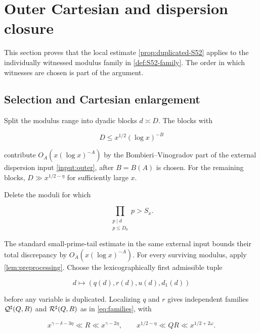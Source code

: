 \section{Outer Cartesian and dispersion closure}
\label{sec:outer}

This section proves that the local estimate
\cref{prop:duplicated-S52} applies to the individually witnessed modulus
family in \cref{def:S52-family}.  The order in which witnesses are chosen is
part of the argument.

\subsection{Selection and Cartesian enlargement}

Split the modulus range into dyadic blocks $d\asymp D$.  The blocks with

\begin{equation}\label{eq:low-moduli}
 D\le x^{1/2}(\log x)^{-B}
\end{equation}

contribute $O_A(x(\log x)^{-A})$ by the Bombieri--Vinogradov part of the
external dispersion input \ref{input:outer}, after $B=B(A)$ is chosen.
For the remaining blocks, $D\gg x^{1/2-\eta}$ for sufficiently large $x$.

Delete the moduli for which

\begin{equation}\label{eq:exceptional-small-primes}
 \prod_{\substack{p\mid d\\p\le D_0}}p>S_x.
\end{equation}

The standard small-prime-tail estimate in the same external input bounds
their total discrepancy by $O_A(x(\log x)^{-A})$.  For every surviving
modulus, apply \cref{lem:preprocessing}.  Choose the lexicographically first
admissible tuple

\begin{equation}\label{eq:witness-order-first}
 d\longmapsto(q(d),r(d),u(d),d_1(d))
\end{equation}

before any variable is duplicated.  Localizing $q$ and $r$ gives independent
families $\mathcal Q^{\sharp}(Q,R)$ and $\mathcal R^{\sharp}(Q,R)$ as in \cref{eq:families}, with

\begin{equation}\label{eq:outer-QR}
 x^{\gamma-\delta-3\eta}\ll R\ll x^{\gamma-2\eta},
 \qquad
 x^{1/2-\eta}\ll QR\ll x^{1/2+2\omega}.
\end{equation}


